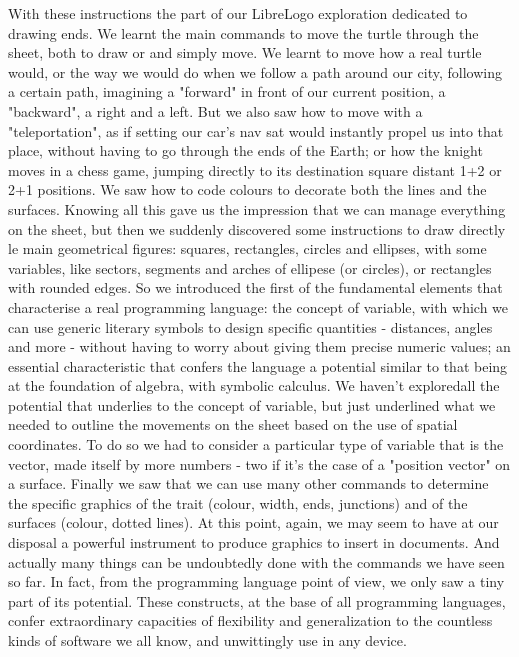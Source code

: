 With these instructions the part of our LibreLogo exploration dedicated to drawing ends. We learnt the main commands to move the turtle through the sheet, both to draw or and simply move. We learnt to move how a real turtle would, or the way we would do when we follow a path around our city, following a certain path, imagining a "forward" in front of our current position, a "backward", a right and a left. But we also saw how to move with a "teleportation", as if setting our car's nav sat would instantly propel us into that place, without having to go through the ends of the Earth; or how the knight moves in a chess game, jumping directly to its destination square distant 1+2 or 2+1 positions. We saw how to code colours to decorate both the lines and the surfaces. Knowing all this gave us the impression that we can manage everything on the sheet, but then we suddenly discovered some instructions to draw directly le main geometrical figures: squares, rectangles, circles and ellipses, with some variables, like sectors, segments and arches of ellipese (or circles), or rectangles with rounded edges. So we introduced the first of the fundamental elements that characterise a real programming language: the concept of variable, with which we can use generic literary symbols to design specific quantities - distances, angles and more - without having to worry about giving them precise numeric values; an essential characteristic that confers the language a potential similar to that being at the foundation of algebra, with symbolic calculus. We haven't exploredall the potential that underlies to the concept of variable, but just underlined what we needed to outline the movements on the sheet based on the use of spatial coordinates. To do so we had to consider a particular type of variable that is the vector, made itself by more numbers - two if it's the case of a "position vector" on a surface. Finally we saw that we can use many other commands to determine the specific graphics of the trait (colour, width, ends, junctions) and of the surfaces (colour, dotted lines). At this point, again, we may seem to have at our disposal a powerful instrument to produce graphics to insert in documents. And actually many things can be undoubtedly done with the commands we have seen so far. In fact, from the programming language point of view, we only saw a tiny part of its potential. These constructs, at the base of all programming languages, confer extraordinary capacities of flexibility and generalization to the countless kinds of software we all know, and unwittingly use in any device.

















